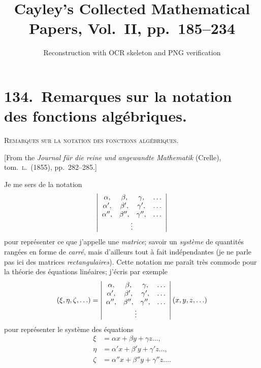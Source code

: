 \documentclass[11pt,a4paper]{article}
\title{Cayley's Collected Mathematical Papers, Vol.~II, pp.\ 185--234}
\author{Reconstruction with OCR skeleton and PNG verification}
\date{}
\begin{document}
\maketitle

\section*{134.\ Remarques sur la notation des fonctions alg\'ebriques.}

\begin{center}\textsc{Remarques sur la notation des fonctions alg\'ebriques.}\end{center}

[From the \textit{Journal f\"ur die reine und angewandte Mathematik} (Crelle), tom.\ \textsc{l}.\ (1855), pp.\ 282--285.]

\medskip

\noindent Je me sers de la notation
\[
\left\lvert\begin{array}{cccc}
\alpha , & \beta , & \gamma , & \ldots\\
\alpha', & \beta', & \gamma', & \ldots\\
\alpha'', & \beta'', & \gamma'', & \ldots\\
\multicolumn{4}{c}{\vdots}
\end{array}\right\rvert
\]
pour repr\'esenter ce que j'appelle une \textit{matrice}; savoir un \textit{syst\`eme} de quantit\'es rang\'ees en forme de \textit{carr\'e}, mais d'ailleurs tout \`a fait ind\'ependantes (je ne parle pas ici des matrices \textit{rectangulaires}). Cette notation me para\^it tr\`es commode pour la th\'eorie des \'equations lin\'eaires; j'\'ecris par exemple
\[
(\xi,\eta,\zeta,\ldots) = \left\lvert\begin{array}{cccc}
\alpha , & \beta , & \gamma , & \ldots\\
\alpha', & \beta', & \gamma', & \ldots\\
\alpha'', & \beta'', & \gamma'', & \ldots\\
\multicolumn{4}{c}{\vdots}
\end{array}\right\rvert (x,y,z,\ldots)
\]
pour repr\'esenter le syst\`eme des \'equations
\begin{align*}
\xi    &= \alpha x + \beta y + \gamma z \ldots,\\
\eta   &= \alpha' x + \beta' y + \gamma' z \ldots,\\
\zeta  &= \alpha'' x + \beta'' y + \gamma'' z \ldots.
\end{align*}
\end{document}
